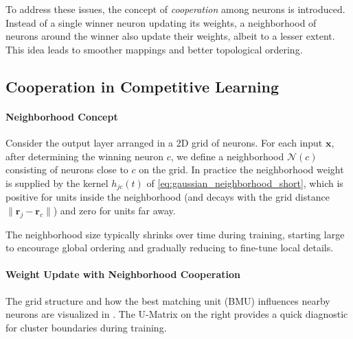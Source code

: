 To address these issues, the concept of \emph{cooperation} among neurons is introduced. Instead of a single winner neuron updating its weights, a neighborhood of neurons around the winner also update their weights, albeit to a lesser extent. This idea leads to smoother mappings and better topological ordering.

\subsection{Cooperation in Competitive Learning}
\label{sec:som_neighborhood}

\paragraph{Neighborhood Concept}

Consider the output layer arranged in a 2D grid of neurons. For each input \(\mathbf{x}\), after determining the winning neuron \(c\), we define a neighborhood \(\mathcal{N}(c)\) consisting of neurons close to \(c\) on the grid. In practice the neighborhood weight is supplied by the kernel \(h_{jc}(t)\) of \eqref{eq:gaussian_neighborhood_short}, which is positive for units inside the neighborhood (and decays with the grid distance \(\|\mathbf{r}_j - \mathbf{r}_c\|\)) and zero for units far away.

The neighborhood size typically shrinks over time during training, starting large to encourage global ordering and gradually reducing to fine-tune local details.

\paragraph{Weight Update with Neighborhood Cooperation}
The grid structure and how the best matching unit (BMU) influences nearby neurons are visualized in . The U-Matrix on the right provides a quick diagnostic for cluster boundaries during training.

